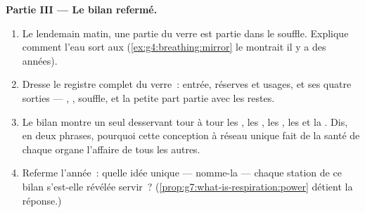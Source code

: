 \begin{problem}
\medskip\noindent\textbf{Partie III --- Le bilan refermé.}
\begin{enumerate}[resume]
  \item Le lendemain matin, une partie du verre est partie dans le
        souffle. Explique comment l'eau sort aux 
        (\cref{ex:g4:breathing:mirror} le montrait il y a des
        années).
  \item Dresse le registre complet du verre~: entrée, réserves et
        usages, et ses quatre sorties --- , , souffle, et
        la petite part partie avec les restes.
  \item Le bilan montre un seul  desservant tour à tour les
        , les , les , les  et la .
        Dis, en deux phrases, pourquoi cette conception à réseau
        unique fait de la santé de chaque organe l'affaire de tous
        les autres.
  \item Referme l'année~: quelle idée unique --- nomme-la ---
        chaque station de ce bilan s'est-elle révélée servir~?
        (\cref{prop:g7:what-is-respiration:power} détient la
        réponse.)
\end{enumerate}
\end{problem}
